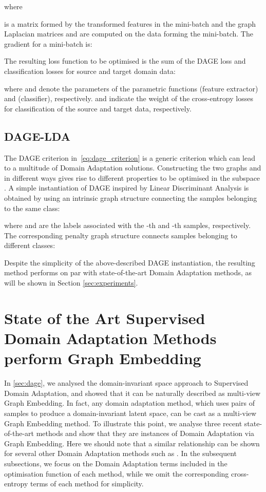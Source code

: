 \documentclass[journal]{IEEEtran}
\begin{document}
where 

is a matrix formed by the transformed features in the mini-batch  and the graph Laplacian matrices  and  are computed on the data forming the mini-batch. 
The gradient for a mini-batch is:


The resulting loss function to be optimised is the sum of the DAGE loss and classification losses for source and target domain data:

where  and  denote the parameters of the parametric functions  (feature extractor) and  (classifier), respectively.  and  indicate the weight of the cross-entropy losses for classification of the source and target data, respectively.


\subsection{DAGE-LDA} \label{sec:dage-lda}
The DAGE criterion in~\cref{eq:dage_criterion} is a generic criterion which can lead to a multitude of Domain Adaptation solutions. Constructing the two graphs  and  in different ways gives rise to different properties to be optimised in the subspace . A simple instantiation of DAGE inspired by Linear Discriminant Analysis is obtained by using an intrinsic graph structure connecting the samples belonging to the same class:

where  and  are the labels associated with the -th and -th samples, respectively. The corresponding penalty graph structure connects samples belonging to different classes:

Despite the simplicity of the above-described DAGE instantiation, the resulting method performs on par with state-of-the-art Domain Adaptation methods, as will be shown in Section \ref{sec:experiments}.  




\section{State of the Art Supervised Domain Adaptation Methods perform Graph Embedding}\label{sec:sota-as-ge}
In \cref{sec:dage}, we analysed the domain-invariant space approach to Supervised Domain Adaptation, and showed that it can be naturally described as multi-view Graph Embedding. In fact, any domain adaptation method, which uses pairs of samples to produce a domain-invariant latent space, can be cast as a multi-view Graph Embedding method.
To illustrate this point, we analyse three recent state-of-the-art methods and show that they are instances of Domain Adaptation via Graph Embedding. Here we should note that a similar relationship can be shown for several other Domain Adaptation methods such as \cite{das2018graph, koniusz2017domain}. In the subsequent subsections, we focus on the Domain Adaptation terms included in the optimisation function of each method, while we omit the corresponding cross-entropy terms of each method for simplicity.
\end{document}
